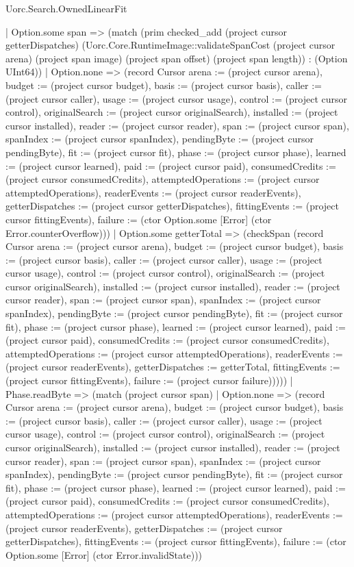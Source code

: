 \begin{lexlean}{Uorc.Search.OwnedLinearFit}
\begin{semanticmodule}
{      | Option.some span => (match (prim checked_add (project cursor getterDispatches) (Uorc.Core.RuntimeImage::validateSpanCost (project cursor arena) (project span image) (project span offset) (project span length)) : (Option UInt64))
        | Option.none => (record Cursor {arena := (project cursor arena), budget := (project cursor budget), basis := (project cursor basis), caller := (project cursor caller), usage := (project cursor usage), control := (project cursor control), originalSearch := (project cursor originalSearch), installed := (project cursor installed), reader := (project cursor reader), span := (project cursor span), spanIndex := (project cursor spanIndex), pendingByte := (project cursor pendingByte), fit := (project cursor fit), phase := (project cursor phase), learned := (project cursor learned), paid := (project cursor paid), consumedCredits := (project cursor consumedCredits), attemptedOperations := (project cursor attemptedOperations), readerEvents := (project cursor readerEvents), getterDispatches := (project cursor getterDispatches), fittingEvents := (project cursor fittingEvents), failure := (ctor Option.some [Error] (ctor Error.counterOverflow))})
        | Option.some getterTotal => (checkSpan (record Cursor {arena := (project cursor arena), budget := (project cursor budget), basis := (project cursor basis), caller := (project cursor caller), usage := (project cursor usage), control := (project cursor control), originalSearch := (project cursor originalSearch), installed := (project cursor installed), reader := (project cursor reader), span := (project cursor span), spanIndex := (project cursor spanIndex), pendingByte := (project cursor pendingByte), fit := (project cursor fit), phase := (project cursor phase), learned := (project cursor learned), paid := (project cursor paid), consumedCredits := (project cursor consumedCredits), attemptedOperations := (project cursor attemptedOperations), readerEvents := (project cursor readerEvents), getterDispatches := getterTotal, fittingEvents := (project cursor fittingEvents), failure := (project cursor failure)}))))
    | Phase.readByte => (match (project cursor span)
      | Option.none => (record Cursor {arena := (project cursor arena), budget := (project cursor budget), basis := (project cursor basis), caller := (project cursor caller), usage := (project cursor usage), control := (project cursor control), originalSearch := (project cursor originalSearch), installed := (project cursor installed), reader := (project cursor reader), span := (project cursor span), spanIndex := (project cursor spanIndex), pendingByte := (project cursor pendingByte), fit := (project cursor fit), phase := (project cursor phase), learned := (project cursor learned), paid := (project cursor paid), consumedCredits := (project cursor consumedCredits), attemptedOperations := (project cursor attemptedOperations), readerEvents := (project cursor readerEvents), getterDispatches := (project cursor getterDispatches), fittingEvents := (project cursor fittingEvents), failure := (ctor Option.some [Error] (ctor Error.invalidState))})
}
\end{semanticmodule}
\end{lexlean}
